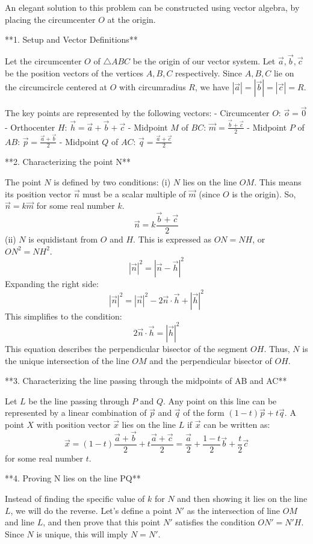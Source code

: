 An elegant solution to this problem can be constructed using vector algebra, by placing the circumcenter $O$ at the origin.

**1. Setup and Vector Definitions**

Let the circumcenter $O$ of $\triangle ABC$ be the origin of our vector system. Let $\vec{a}, \vec{b}, \vec{c}$ be the position vectors of the vertices $A, B, C$ respectively. Since $A,B,C$ lie on the circumcircle centered at $O$ with circumradius $R$, we have $|\vec{a}| = |\vec{b}| = |\vec{c}| = R$.

The key points are represented by the following vectors:
- Circumcenter $O$: $\vec{o} = \vec{0}$
- Orthocenter $H$: $\vec{h} = \vec{a} + \vec{b} + \vec{c}$
- Midpoint $M$ of $BC$: $\vec{m} = \frac{\vec{b}+\vec{c}}{2}$
- Midpoint $P$ of $AB$: $\vec{p} = \frac{\vec{a}+\vec{b}}{2}$
- Midpoint $Q$ of $AC$: $\vec{q} = \frac{\vec{a}+\vec{c}}{2}$

**2. Characterizing the point N**

The point $N$ is defined by two conditions:
(i) $N$ lies on the line $OM$. This means its position vector $\vec{n}$ must be a scalar multiple of $\vec{m}$ (since $O$ is the origin). So, $\vec{n} = k\vec{m}$ for some real number $k$.
$$ \vec{n} = k \frac{\vec{b}+\vec{c}}{2} $$
(ii) $N$ is equidistant from $O$ and $H$. This is expressed as $ON = NH$, or $ON^2 = NH^2$.
$$ |\vec{n}|^2 = |\vec{n}-\vec{h}|^2 $$
Expanding the right side:
$$ |\vec{n}|^2 = |\vec{n}|^2 - 2\vec{n}\cdot\vec{h} + |\vec{h}|^2 $$
This simplifies to the condition:
$$ 2\vec{n}\cdot\vec{h} = |\vec{h}|^2 $$
This equation describes the perpendicular bisector of the segment $OH$. Thus, $N$ is the unique intersection of the line $OM$ and the perpendicular bisector of $OH$.

**3. Characterizing the line passing through the midpoints of AB and AC**

Let $L$ be the line passing through $P$ and $Q$. Any point on this line can be represented by a linear combination of $\vec{p}$ and $\vec{q}$ of the form $(1-t)\vec{p} + t\vec{q}$.
A point $X$ with position vector $\vec{x}$ lies on the line $L$ if $\vec{x}$ can be written as:
$$ \vec{x} = (1-t) \frac{\vec{a}+\vec{b}}{2} + t \frac{\vec{a}+\vec{c}}{2} = \frac{\vec{a}}{2} + \frac{1-t}{2}\vec{b} + \frac{t}{2}\vec{c} $$
for some real number $t$.

**4. Proving N lies on the line PQ**

Instead of finding the specific value of $k$ for $N$ and then showing it lies on the line $L$, we will do the reverse. Let's define a point $N'$ as the intersection of line $OM$ and line $L$, and then prove that this point $N'$ satisfies the condition $ON' = N'H$. Since $N$ is unique, this will imply $N=N'$.

